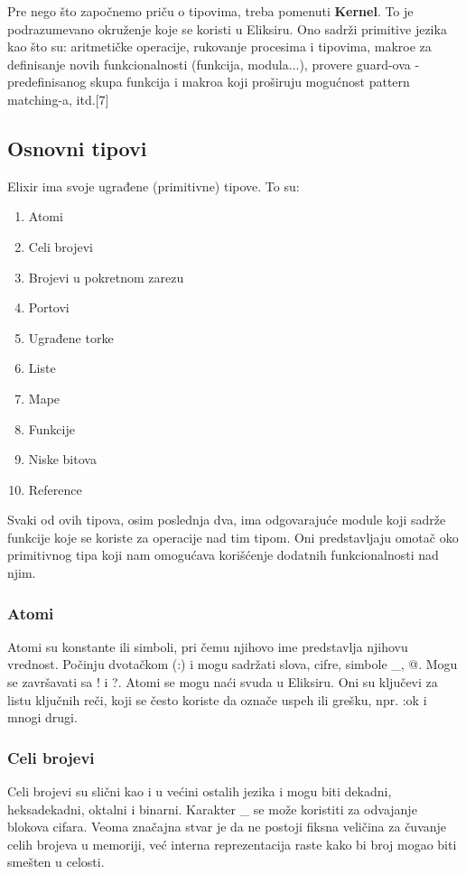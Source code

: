\documentclass[12pt,oneside]{memoir}
\begin{document}
Pre nego što započnemo priču o tipovima, treba pomenuti \textbf{Kernel}. To je podrazumevano okruženje koje se koristi u Eliksiru. Ono sadrži primitive jezika kao što su: aritmetičke operacije, rukovanje procesima i tipovima, makroe za definisanje novih funkcionalnosti (funkcija, modula...), provere guard-ova - predefinisanog skupa funkcija i makroa koji proširuju
mogućnost pattern matching-a, itd.[7]

\subsection{Osnovni tipovi}

Elixir ima svoje ugrađene (primitivne) tipove. To su: 
\begin{enumerate}
    \item {Atomi}
    \item {Celi brojevi}
    \item {Brojevi u pokretnom zarezu}
    \item {Portovi}
    \item {Ugrađene torke}
    \item {Liste}
    \item {Mape}
    \item {Funkcije}
    \item {Niske bitova}
    \item {Reference}
\end{enumerate}

Svaki od ovih tipova, osim poslednja dva, ima odgovarajuće module koji sadrže funkcije koje se koriste za operacije nad tim tipom. Oni predstavljaju omotač oko primitivnog tipa koji nam omogućava korišćenje dodatnih funkcionalnosti nad njim.\\

\subsubsection{Atomi}
Atomi su konstante ili simboli, pri čemu njihovo ime predstavlja njihovu vrednost. Počinju dvotačkom (:) i mogu sadržati slova, cifre, simbole \_, @. Mogu se završavati sa ! i ?. Atomi se mogu naći svuda u Eliksiru. Oni su ključevi za listu ključnih reči, koji se često koriste da označe uspeh ili grešku, npr. :ok i mnogi drugi.\\

\subsubsection{Celi brojevi}
Celi brojevi su slični kao i u većini ostalih jezika i mogu biti dekadni, heksadekadni, oktalni i binarni. Karakter \_ se može koristiti za odvajanje blokova cifara. Veoma značajna stvar je da ne postoji fiksna veličina za čuvanje celih brojeva u memoriji, već interna reprezentacija raste kako bi broj mogao biti smešten u celosti.\\
\end{document}
